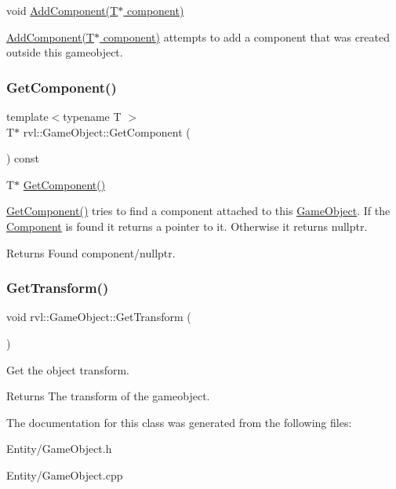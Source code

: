 void \hyperlink{classrvl_1_1_game_object_a4b91502ba7295337f55c832dea27cf67}{Add\+Component(\+T$\ast$ component)} 

\hyperlink{classrvl_1_1_game_object_a4b91502ba7295337f55c832dea27cf67}{Add\+Component(\+T$\ast$ component)} attempts to add a component that was created outside this gameobject. \mbox{\label{classrvl_1_1_game_object_a84322da781cdc35cc352e4aaac5f9e47}} 
\subsubsection{\texorpdfstring{Get\+Component()}{GetComponent()}}
{\footnotesize\ttfamily template$<$typename T $>$ \\
T$\ast$ rvl\+::\+Game\+Object\+::\+Get\+Component (\begin{DoxyParamCaption}{ }\end{DoxyParamCaption}) const\hspace{0.3cm}{\ttfamily [inline]}}



T$\ast$ \hyperlink{classrvl_1_1_game_object_a84322da781cdc35cc352e4aaac5f9e47}{Get\+Component()} 

\hyperlink{classrvl_1_1_game_object_a84322da781cdc35cc352e4aaac5f9e47}{Get\+Component()} tries to find a component attached to this \hyperlink{classrvl_1_1_game_object}{Game\+Object}. If the \hyperlink{classrvl_1_1_component}{Component} is found it returns a pointer to it. Otherwise it returns nullptr.

\begin{DoxyReturn}{Returns}
Found component/nullptr. 
\end{DoxyReturn}
\mbox{\label{classrvl_1_1_game_object_adfe0989dce9c2bf40a2b940595d7f6e3}} 
\subsubsection{\texorpdfstring{Get\+Transform()}{GetTransform()}}
{\footnotesize\ttfamily void rvl\+::\+Game\+Object\+::\+Get\+Transform (\begin{DoxyParamCaption}{ }\end{DoxyParamCaption})}



Get the object transform. 

\begin{DoxyReturn}{Returns}
The transform of the gameobject. 
\end{DoxyReturn}


The documentation for this class was generated from the following files\+:\begin{DoxyCompactItemize}
\item 
Entity/Game\+Object.\+h\item 
Entity/Game\+Object.\+cpp\end{DoxyCompactItemize}
